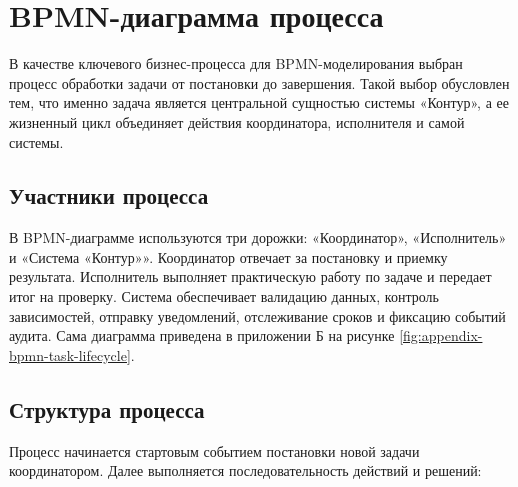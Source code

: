 \section{BPMN-диаграмма процесса}
\headingtextsep

В качестве ключевого бизнес-процесса для BPMN-моделирования выбран процесс обработки задачи от постановки до завершения. Такой выбор обусловлен тем, что именно задача является центральной сущностью системы «Контур», а ее жизненный цикл объединяет действия координатора, исполнителя и самой системы.

\textheadingsep
\subsection{Участники процесса}
\headingtextsep

В BPMN-диаграмме используются три дорожки: «Координатор», «Исполнитель» и «Система «Контур»». Координатор отвечает за постановку и приемку результата. Исполнитель выполняет практическую работу по задаче и передает итог на проверку. Система обеспечивает валидацию данных, контроль зависимостей, отправку уведомлений, отслеживание сроков и фиксацию событий аудита. Сама диаграмма приведена в приложении Б на рисунке \ref{fig:appendix-bpmn-task-lifecycle}.

\textheadingsep
\subsection{Структура процесса}
\headingtextsep

Процесс начинается стартовым событием постановки новой задачи координатором. Далее выполняется последовательность действий и решений:

